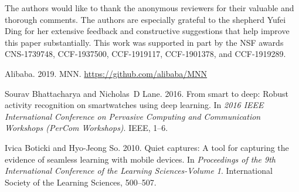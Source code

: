 \documentclass[sigplan,screen]{acmart}
\begin{document}
The authors would like to thank the anonymous reviewers for their valuable and thorough comments. The authors are especially grateful to the shepherd
Yufei Ding for her extensive feedback and constructive suggestions that help improve this paper substantially. This work was
supported in part by the NSF awards CNS-1739748, CCF-1937500, CCF-1919117, CCF-1901378, and CCF-1919289. 

 
\balance


\begin{thebibliography}{65}



\ifx \showCODEN    \undefined {}     \fi
\ifx \showDOI      \undefined \def \showDOI       #1{#1}\fi
\ifx \showISBNx    \undefined \def \showISBNx     #1{\unskip}     \fi
\ifx \showISBNxiii \undefined \def \showISBNxiii  #1{\unskip}     \fi
\ifx \showISSN     \undefined \def \showISSN      #1{\unskip}     \fi
\ifx \showLCCN     \undefined \def \showLCCN      #1{\unskip}     \fi
\ifx \shownote     \undefined \def \shownote      #1{#1}          \fi
\ifx \showarticletitle \undefined \def \showarticletitle #1{#1}   \fi
\ifx \showURL      \undefined \def \showURL       {\relax}        \fi
\providecommand\bibfield[2]{#2}
\providecommand\bibinfo[2]{#2}
\providecommand\natexlab[1]{#1}
\providecommand\showeprint[2][]{arXiv:#2}

\bibfield{author}{\bibinfo{person}{Alibaba}.} \bibinfo{year}{2019}\natexlab{}.
\newblock \bibinfo{title}{MNN}.
\newblock
\newblock
\urldef\tempurl \url{https://github.com/alibaba/MNN}
\showURL{\tempurl}


\bibfield{author}{\bibinfo{person}{Sourav Bhattacharya} {and}
  \bibinfo{person}{Nicholas~D Lane}.} \bibinfo{year}{2016}\natexlab{}.
\newblock \showarticletitle{From smart to deep: Robust activity recognition on
  smartwatches using deep learning}. In \bibinfo{booktitle}{\emph{2016 IEEE
  International Conference on Pervasive Computing and Communication Workshops
  (PerCom Workshops)}}. IEEE, \bibinfo{pages}{1--6}.
\newblock


\bibfield{author}{\bibinfo{person}{Ivica Boticki} {and}
  \bibinfo{person}{Hyo-Jeong So}.} \bibinfo{year}{2010}\natexlab{}.
\newblock \showarticletitle{Quiet captures: A tool for capturing the evidence
  of seamless learning with mobile devices}. In
  \bibinfo{booktitle}{\emph{Proceedings of the 9th International Conference of
  the Learning Sciences-Volume 1}}. International Society of the Learning
  Sciences, \bibinfo{pages}{500--507}.
\newblock



\end{thebibliography}
\end{document}

